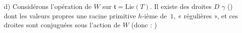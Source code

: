 \documentclass[11pt,a4paper]{article}
\begin{document}
d) Considérons l'opération de $W$ sur
$\mathfrak{t} = \mathrm{Lie}(T)$. Il existe des \struck{\ill{}}
droites $D$ \uncertain{\ill{}}  $\gamma$
() dont les valeurs propres  une
racine primitive $h$-ième de~$1$,  
 « régulières », et ces droites sont conjuguées sous
l'action de $W$ (donc :  
\ill{})
\end{document}
